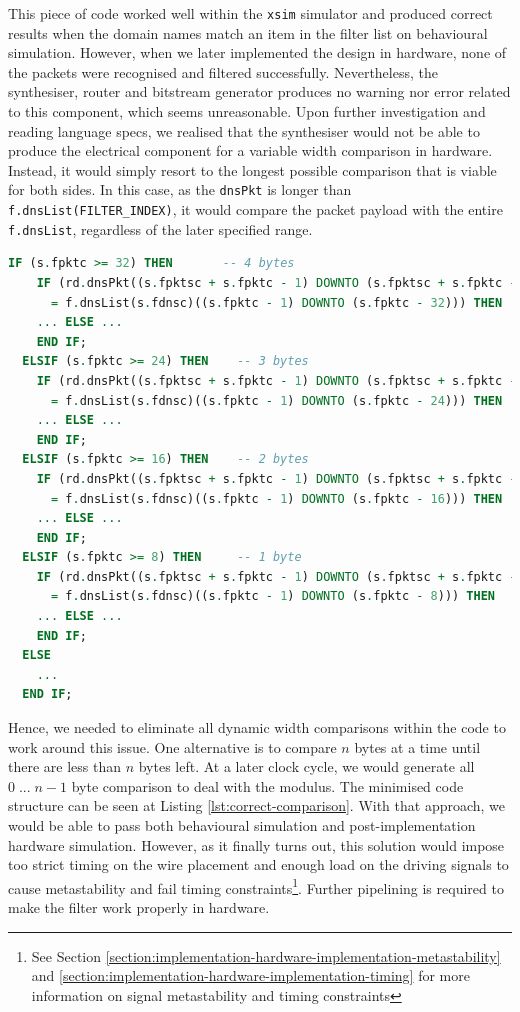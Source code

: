 \documentclass[a4paper]{report}
\newcommand{\proglang}{\textsf}
\newcommand{\code}{\texttt}
\begin{document}
This piece of code worked well within the \code{xsim} simulator and produced correct results when the domain names match an item in the filter list on behavioural simulation. However, when we later implemented the design in hardware, none of the packets were recognised and filtered successfully. Nevertheless, the synthesiser, router and bitstream generator produces no warning nor error related to this component, which seems unreasonable. Upon further investigation and reading language specs, we realised that the synthesiser would not be able to produce the electrical component for a variable width comparison in hardware. Instead, it would simply resort to the longest possible comparison that
is viable for both sides. In this case, as the \code{dnsPkt} is longer than \code{f.dnsList(FILTER\_INDEX)}, it would compare the packet payload with the entire \code{f.dnsList}, regardless of the later specified range.

\begin{lstlisting}[language=VHDL, caption=Dynamic width \code{STD\_LOGIC\_VECTOR} comparison in \proglang{VHDL}, label={lst:correct-comparison}]
  IF (s.fpktc >= 32) THEN       -- 4 bytes
    IF (rd.dnsPkt((s.fpktsc + s.fpktc - 1) DOWNTO (s.fpktsc + s.fpktc - 32))
      = f.dnsList(s.fdnsc)((s.fpktc - 1) DOWNTO (s.fpktc - 32))) THEN
    ... ELSE ...
    END IF;
  ELSIF (s.fpktc >= 24) THEN    -- 3 bytes
    IF (rd.dnsPkt((s.fpktsc + s.fpktc - 1) DOWNTO (s.fpktsc + s.fpktc - 24))
      = f.dnsList(s.fdnsc)((s.fpktc - 1) DOWNTO (s.fpktc - 24))) THEN
    ... ELSE ...
    END IF;          
  ELSIF (s.fpktc >= 16) THEN    -- 2 bytes    
    IF (rd.dnsPkt((s.fpktsc + s.fpktc - 1) DOWNTO (s.fpktsc + s.fpktc - 16))
      = f.dnsList(s.fdnsc)((s.fpktc - 1) DOWNTO (s.fpktc - 16))) THEN
    ... ELSE ...
    END IF;                 
  ELSIF (s.fpktc >= 8) THEN     -- 1 byte
    IF (rd.dnsPkt((s.fpktsc + s.fpktc - 1) DOWNTO (s.fpktsc + s.fpktc - 8))
      = f.dnsList(s.fdnsc)((s.fpktc - 1) DOWNTO (s.fpktc - 8))) THEN
    ... ELSE ...
    END IF;
  ELSE
    ...
  END IF; 
\end{lstlisting}

Hence, we needed to eliminate all dynamic width comparisons within the code to work around this issue. One alternative is to compare $n$ bytes at a time until there are less than $n$ bytes left. At a later clock cycle, we would generate all $0 \;...\;n-1$ byte comparison to deal with the modulus. The minimised code structure can be seen at Listing \ref{lst:correct-comparison}. With that approach, we would be able to pass both behavioural simulation and post-implementation hardware simulation. However, as it finally turns out, this solution would impose too strict timing on the wire placement and enough load on the driving signals to cause metastability and fail timing constraints\footnote{See Section \ref{section:implementation-hardware-implementation-metastability} and \ref{section:implementation-hardware-implementation-timing} for more information on signal metastability and timing constraints}. Further pipelining is required to make the filter work properly in hardware.
\end{document}
